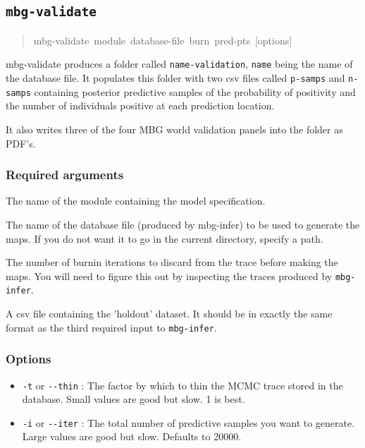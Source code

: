 \subsection{\texttt{mbg-validate}%
}
%
\begin{quote}{\ttfamily \raggedright \noindent
mbg-validate~module~database-file~burn~pred-pts~{[}options{]}
}
\end{quote}

mbg-validate produces a folder called \texttt{name-validation}, \texttt{name} being the name of the database file.
It populates this folder with two csv files called \texttt{p-samps} and \texttt{n-samps} containing posterior
predictive samples of the probability of positivity and the number of individuals positive at each
prediction location.

It also writes three of the four MBG world validation panels into the folder as PDF's.




\subsubsection{Required arguments%
}
\setcounter{listcnt0}{0}
\begin{list}{.}
{
\setlength{\rightmargin}{\leftmargin}
}

\item The name of the module containing the model specification.

\item The name of the database file (produced by mbg-infer) to be used to generate the
maps. If you do not want it to go in the current directory, specify a path.

\item The number of burnin iterations to discard from the trace before making the maps.
You will need to figure this out by inspecting the traces produced by \texttt{mbg-infer}.

\item A csv file containing the 'holdout' dataset. It should be in exactly the same format
as the third required input to \texttt{mbg-infer}.
\end{list}




\subsubsection{Options%
}
%
\begin{itemize}

\item \texttt{-t} or \texttt{-{}-thin} : The factor by which to thin the MCMC trace stored in the database.
Small values are good but slow. 1 is best.

\item \texttt{-i} or \texttt{-{}-iter} : The total number of predictive samples you want to generate. Large
values are good but slow. Defaults to 20000.

\end{itemize}




